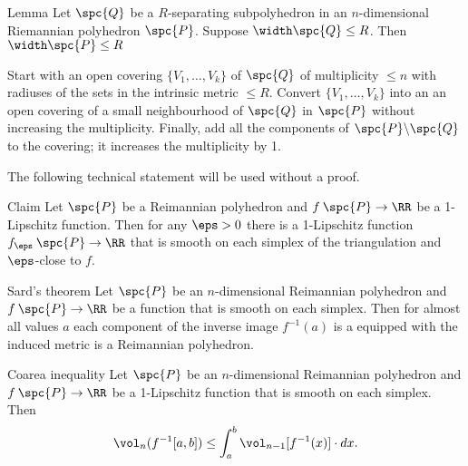 \begin{thm}{Lemma}
Let $\spc{Q}$ be a $R$-separating subpolyhedron in an $n$-dimensional Riemannian polyhedron $\spc{P}$.
Suppose $\width\spc{Q}\le R$.
Then $\width\spc{P}\le R$
\end{thm}

Start with an open covering $\{V_1,\dots,V_k\}$ of $\spc{Q}$ of multiplicity $\le n$ with radiuses of the sets in the intrinsic metric $\le R$.
Convert $\{V_1,\dots,V_k\}$ into an an open covering of
a small neighbourhood of $\spc{Q}$ in $\spc{P}$ without increasing the multiplicity.
Finally, add all the components of $\spc{P}\backslash \spc{Q}$ to the covering;
it increases the multiplicity by 1.
\qeds

The following technical statement will be used without a proof.

\begin{thm}{Claim}
Let $\spc{P}$ be a Reimannian polyhedron and $f\:\spc{P}\to \RR$ be a 1-Lipschitz function.
Then for any $\eps>0$ there is a  1-Lipschitz function $f_\eps\:\spc{P}\to \RR$ that is smooth on each simplex of the triangulation and $\eps$-close to $f$.
\end{thm}

\begin{thm}{Sard's theorem}
Let $\spc{P}$ be an $n$-dimensional Reimannian polyhedron and $f\:\spc{P}\to \RR$ be a function that is smooth on each simplex.
Then for almost all values $a$ each component of the inverse image $f^{-1}(a)$ is a equipped with the induced metric is a Reimannian polyhedron.
\end{thm}


\begin{thm}{Coarea inequality}
Let $\spc{P}$ be an $n$-dimensional Reimannian polyhedron and $f\:\spc{P}\to \RR$ be a 1-Lipschitz function that is smooth on each simplex.
Then 
\[\vol_n (f^{-1}[a,b]) \le \int_a^b\vol_{n-1}[f^{-1}(x)]\cdot dx.\]
\end{thm}

